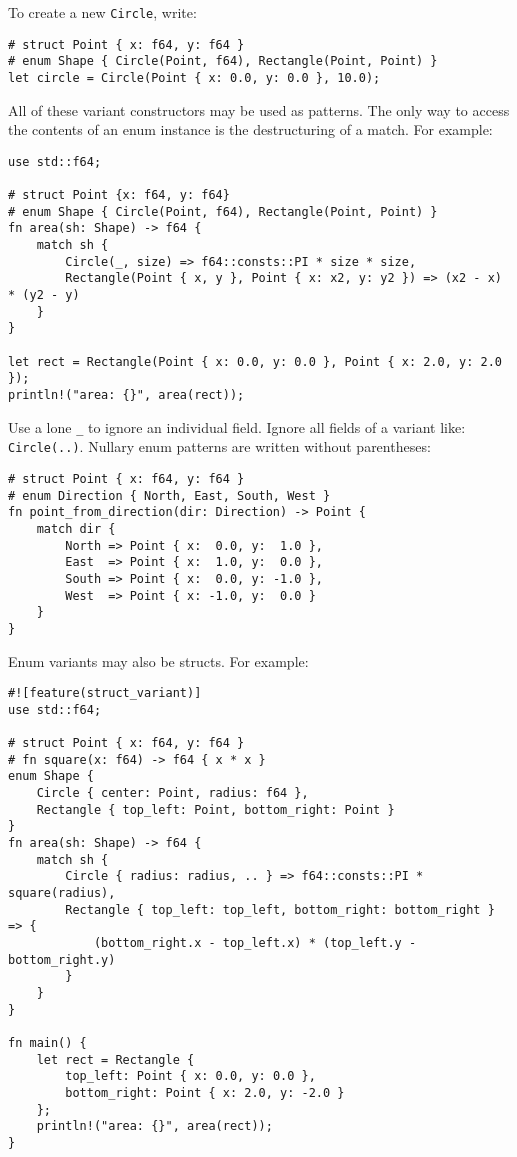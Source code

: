 \documentclass[]{article}
\begin{document}
To create a new \texttt{Circle}, write:

\begin{verbatim}
# struct Point { x: f64, y: f64 }
# enum Shape { Circle(Point, f64), Rectangle(Point, Point) }
let circle = Circle(Point { x: 0.0, y: 0.0 }, 10.0);
\end{verbatim}

All of these variant constructors may be used as patterns. The only way
to access the contents of an enum instance is the destructuring of a
match. For example:

\begin{verbatim}
use std::f64;

# struct Point {x: f64, y: f64}
# enum Shape { Circle(Point, f64), Rectangle(Point, Point) }
fn area(sh: Shape) -> f64 {
    match sh {
        Circle(_, size) => f64::consts::PI * size * size,
        Rectangle(Point { x, y }, Point { x: x2, y: y2 }) => (x2 - x) * (y2 - y)
    }
}

let rect = Rectangle(Point { x: 0.0, y: 0.0 }, Point { x: 2.0, y: 2.0 });
println!("area: {}", area(rect));
\end{verbatim}

Use a lone \texttt{\_} to ignore an individual field. Ignore all fields
of a variant like: \texttt{Circle(..)}. Nullary enum patterns are
written without parentheses:

\begin{verbatim}
# struct Point { x: f64, y: f64 }
# enum Direction { North, East, South, West }
fn point_from_direction(dir: Direction) -> Point {
    match dir {
        North => Point { x:  0.0, y:  1.0 },
        East  => Point { x:  1.0, y:  0.0 },
        South => Point { x:  0.0, y: -1.0 },
        West  => Point { x: -1.0, y:  0.0 }
    }
}
\end{verbatim}

Enum variants may also be structs. For example:

\begin{verbatim}
#![feature(struct_variant)]
use std::f64;

# struct Point { x: f64, y: f64 }
# fn square(x: f64) -> f64 { x * x }
enum Shape {
    Circle { center: Point, radius: f64 },
    Rectangle { top_left: Point, bottom_right: Point }
}
fn area(sh: Shape) -> f64 {
    match sh {
        Circle { radius: radius, .. } => f64::consts::PI * square(radius),
        Rectangle { top_left: top_left, bottom_right: bottom_right } => {
            (bottom_right.x - top_left.x) * (top_left.y - bottom_right.y)
        }
    }
}

fn main() {
    let rect = Rectangle {
        top_left: Point { x: 0.0, y: 0.0 },
        bottom_right: Point { x: 2.0, y: -2.0 }
    };
    println!("area: {}", area(rect));
}
\end{verbatim}
\end{document}
